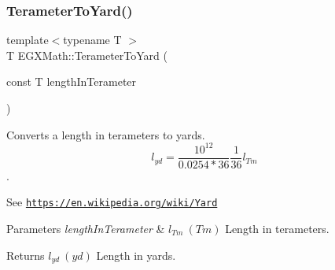 \subsubsection{\texorpdfstring{Terameter\+To\+Yard()}{TerameterToYard()}}
{\footnotesize\ttfamily template$<$typename T $>$ \\
T E\+G\+X\+Math\+::\+Terameter\+To\+Yard (\begin{DoxyParamCaption}\item[{const T}]{length\+In\+Terameter }\end{DoxyParamCaption})}



Converts a length in terameters to yards. \[ l_{yd}= \frac{10^{12}}{0.0254 * 36} \frac{1}{36} l_{Tm} \]. 

See \href{https://en.wikipedia.org/wiki/Yard}{\tt https\+://en.\+wikipedia.\+org/wiki/\+Yard} 
\begin{DoxyParams}{Parameters}
{\em length\+In\+Terameter} & $ l_{Tm}\ (Tm)$ Length in terameters. \\
\hline
\end{DoxyParams}
\begin{DoxyReturn}{Returns}
$ l_{yd}\ (yd)$ Length in yards. 
\end{DoxyReturn}
